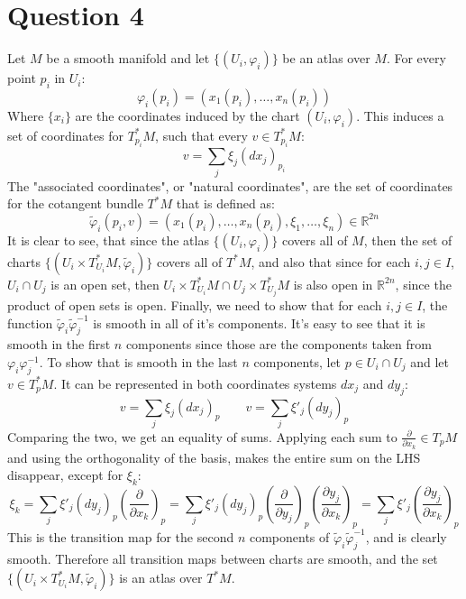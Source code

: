 \documentclass{article}
\newcommand{\R}{\ensuremath{\mathbb{R}}}
\begin{document}
\section*{Question 4}
Let $M$ be a smooth manifold and let $\{(U_i, \varphi_i)\}$ be an atlas over $M$. For every point $p_i$ in $U_i$:
\begin{equation}
    \varphi_i(p_i) = (x_1(p_i), \dots, x_n(p_i))
\end{equation}
Where $\{x_i\}$ are the coordinates induced by the chart $(U_i, \varphi_i)$. This induces a set of coordinates for $T^*_{p_i}M$, such that every $v \in T^*_{p_i}M$:
\begin{equation}
    v = \sum_j \xi_j (dx_j)_{p_i}
\end{equation}
The "associated coordinates", or "natural coordinates", are the set of coordinates for the cotangent bundle $T^*M$ that is defined as:
\begin{equation}
    \tilde{\varphi}_i(p_i, v) = (x_1(p_i), \dots, x_n(p_i), \xi_1, \dots, \xi_n) \in \R^{2n}
\end{equation}
It is clear to see, that since the atlas $\{(U_i, \varphi_i)\}$ covers all of $M$, then the set of charts $\{(U_i\times T^*_{U_i}M, \tilde{\varphi}_i)\}$ covers all of $T^*M$, and also that since for each $i, j \in I$, $U_i \cap U_j$ is an open set, then $U_i\times T^*_{U_i}M \cap U_j\times T^*_{U_j}M$ is also open in $\R^{2n}$, since the product of open sets is open.
Finally, we need to show that for each $i, j \in I$, the function $\tilde{\varphi}_i\tilde{\varphi}^{-1}_j$ is smooth in all of it's components. It's easy to see that it is smooth in the first $n$ components since those are the components taken from $\varphi_i\varphi^{-1}_j$. To show that is smooth in the last $n$ components, let $p \in U_i \cap U_j$ and let $v \in T^*_pM$. It can be represented in both coordinates systems $dx_j$ and $dy_j$:
\begin{equation}
    v = \sum_j \xi_j (dx_j)_p \qquad v = \sum_j \xi'_j (dy_j)_p
\end{equation}
Comparing the two, we get an equality of sums. Applying each sum to $\frac{\partial}{\partial x_k} \in T_pM$ and using the orthogonality of the basis, makes the entire sum on the LHS disappear, except for $\xi_k$:
\begin{equation}
    \xi_k = \sum_j \xi'_j (dy_j)_p\left(\frac{\partial}{\partial x_k}\right)_p = 
    \sum_j \xi'_j (dy_j)_p\left(\frac{\partial}{\partial y_j}\right)_p\left(\frac{\partial y_j}{\partial x_k}\right)_p = 
    \sum_j \xi'_j \left(\frac{\partial y_j}{\partial x_k}\right)_p
\end{equation}
This is the transition map for the second $n$ components of $\tilde{\varphi}_i\tilde{\varphi}^{-1}_j$, and is clearly smooth. Therefore all transition maps between charts are smooth, and the set $\{(U_i\times T^*_{U_i}M, \tilde{\varphi}_i)\}$ is an atlas over $T^*M$.
\end{document}
